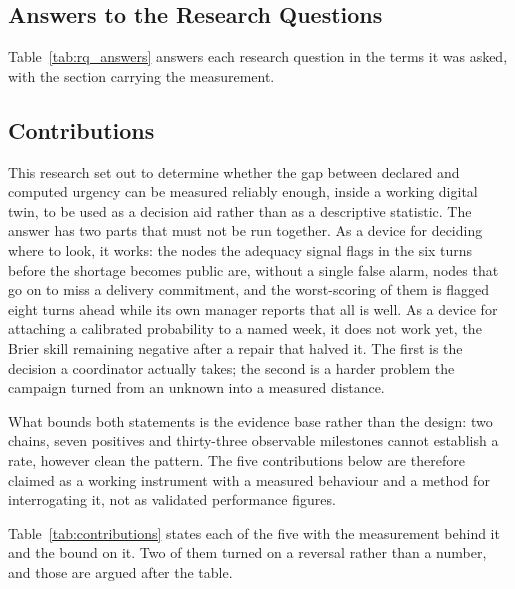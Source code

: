 \subsection{Answers to the Research Questions}
\label{sec:res_synthesis}

Table~\ref{tab:rq_answers} answers each research question in the terms it was asked, with the
section carrying the measurement.

\subsection{Contributions}
\label{sec:contributions}

This research set out to determine whether the gap between declared and computed urgency can
be measured reliably enough, inside a working digital twin, to be used as a decision aid
rather than as a descriptive statistic. The answer has two parts that must not be run
together. As a device for deciding where to look, it works: the nodes the adequacy signal
flags in the six turns before the shortage becomes public are, without a single false alarm,
nodes that go on to miss a delivery commitment, and the worst-scoring of them is flagged eight
turns ahead while its own manager reports that all is well. As a device for attaching a
calibrated probability to a named week, it does not work yet, the Brier skill remaining
negative after a repair that halved it. The first is the decision a coordinator actually
takes; the second is a harder problem the campaign turned from an unknown into a measured
distance.

What bounds both statements is the evidence base rather than the design: two chains, seven
positives and thirty-three observable milestones cannot establish a rate, however clean the
pattern. The five contributions below are therefore claimed as a working instrument with a
measured behaviour and a method for interrogating it, not as validated performance figures.

Table~\ref{tab:contributions} states each of the five with the measurement behind it and the
bound on it. Two of them turned on a reversal rather than a number, and those are argued
after the table.

